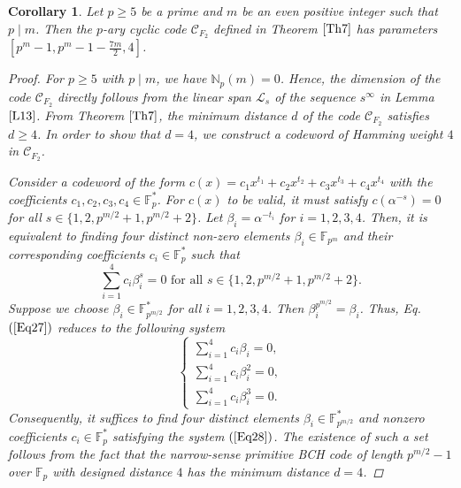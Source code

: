 \documentclass[pdflatex,sn-mathphys-num]{sn-jnl}%
\theoremstyle{thmstyleone}%
\newtheorem{corollary}{Corollary}%
\theoremstyle{thmstyletwo}%
\theoremstyle{thmstylethree}%
\begin{document}
\begin{corollary}\label{cor2} 
    Let $p\geq 5$ be a prime and $m$ be an even positive integer such that $p\mid m$. Then the $p$-ary cyclic code $\mathcal{C}_{F_{2}}$ defined in Theorem $\ref{Th7}$ has parameters $[p^{m}-1,p^m-1-\frac{7m}{2},4]$. 
    \begin{proof}
        For $p\geq5$ with $p\mid m$, we have $\mathbb{N}_{p}(m)=0$. Hence, the dimension of the code $\mathcal{C}_{F_{2}}$ directly follows from the linear span $\mathcal{L}_{s}$ of the sequence $s^{\infty}$ in Lemma $\ref{L13}$. From Theorem $\ref{Th7}$, the minimum distance $d$ of the code $\mathcal{C}_{F_{2}}$ satisfies $d\geq 4$. In order to show that $d=4$, we construct a codeword of Hamming weight $4$ in $\mathcal{C}_{F_{2}}$. 
        \par Consider a codeword of the form $c(x)=c_{1}x^{t_{1}}+c_{2}x^{t_{2}}+c_{3}x^{t_{3}}+c_{4}x^{t_{4}}$ with the coefficients $c_{1},c_{2},c_{3},c_{4}\in\mathbb{F}_{p}^{*}$. For $c(x)$ to be valid, it must satisfy $c(\alpha^{-s})=0$ for all $s\in\{1,2,p^{m/2}+1,p^{m/2}+2\}$. Let $\beta_{i}=\alpha^{-t_{i}}$ for $i=1,2,3,4$. Then, it is equivalent to finding four distinct non-zero elements $\beta_{i}\in\mathbb{F}_{p^m}$ and their corresponding coefficients $c_{i}\in\mathbb{F}_{p}^{*}$ such that
        \begin{equation}\label{Eq27}
            \sum_{i=1}^{4}c_{i}\beta_{i}^{s}=0\text{ for all $s\in\{1,2,p^{m/2}+1,p^{m/2}+2\}$.}
        \end{equation}
        Suppose we choose $\beta_{i}\in\mathbb{F}_{p^{m/2}}^{*}$ for all $i=1,2,3,4$. Then $\beta_{i}^{p^{m/2}}=\beta_{i}$. Thus, Eq. $(\ref{Eq27})$ reduces to the following system  
        \begin{equation}\label{Eq28}
            \begin{cases}
                \sum_{i=1}^{4}c_{i}\beta_{i}=0, \\
                \sum_{i=1}^{4}c_{i}\beta_{i}^{2}=0, \\
                \sum_{i=1}^{4}c_{i}\beta_{i}^{3}=0.
            \end{cases}
        \end{equation}
        Consequently, it suffices to find four distinct elements $\beta_i \in \mathbb{F}_{p^{m/2}}^*$ and nonzero coefficients $c_i \in \mathbb{F}_p^*$ satisfying the system $(\ref{Eq28})$. The existence of such a set follows from the fact that the narrow-sense primitive BCH code of length $p^{m/2}-1$ over $\mathbb{F}_p$ with designed distance $4$ has the minimum distance $d=4$.%

\end{proof}
\end{corollary}
\end{document}
